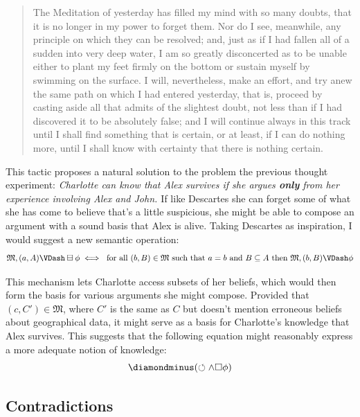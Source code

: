 \documentclass[11pt]{article}
\newcommand{\tmtextit}[1]{{\itshape{#1}}}
\newcommand{\tmstrong}[1]{{\textbf{#1}}}
\numberwithin{equation}{subsection}
\renewcommand{\Omega}{\mathfrak{M}}
\newcommand{\Nec}{\Box}
\newcommand{\BM}{\boxminus}
\newcommand{\DM}{\diamondminus}
\newcommand{\PP}{\circlearrowleft}
\begin{document}
\begin{quote}
{The Meditation of yesterday has filled my mind with so many doubts,
that it is no longer in my power to forget them. Nor do I see, meanwhile, any
principle on which they can be resolved; and, just as if I had fallen all of a
sudden into very deep water, I am so greatly disconcerted as to be unable
either to plant my feet firmly on the bottom or sustain myself by swimming on
the surface. I will, nevertheless, make an effort, and try anew the same path
on which I had entered yesterday, that is, proceed by casting aside all that
admits of the slightest doubt, not less than if I had discovered it to be
absolutely false; and I will continue always in this track until I shall find
something that is certain, or at least, if I can do nothing more, until I
shall know with certainty that there is nothing certain.}\end{quote}

This tactic proposes a natural solution to the problem the previous
thought experiment: \tmtextit{Charlotte can know that Alex survives if she
 argues {\tmstrong{only}} from her experience involving Alex and John.
 }  If like Descartes she can forget some of what she has come to believe that's a
little suspicious, she might be able to compose an argument with a sound basis that Alex is alive.
 Taking Descartes as inspiration, I would suggest a new semantic operation:
\[ \Omega,(a,A) \VDash \BM \phi \iff \textup{ for all }(b,B)\in \Omega\textup{ such that }a = b\textup{ and }B \subseteq A\textup{ then }\Omega,(b,B) \VDash \phi\]

This mechanism lets Charlotte access subsets of her beliefs, which would then form the basis for various arguments she might compose.  Provided that $(c,C')\in \Omega$, where $C'$ is the same as $C$ but doesn't mention erroneous beliefs about geographical data, it might serve as a basis for Charlotte's knowledge that Alex survives.  This suggests that the following equation might reasonably express a more adequate notion of knowledge:
\[ \DM(\PP \wedge \Nec \phi) \]

\subsection{Contradictions}\label{contradictions}
\end{document}
